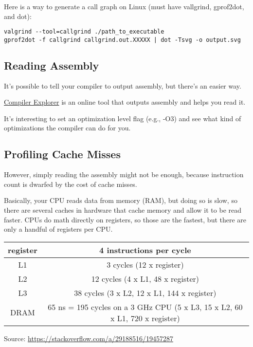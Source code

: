 \documentclass[letterpaper,11pt]{article}
\begin{document}
Here is a way to generate a call graph on Linux (must have vallgrind, gprof2dot, and dot):

\begin{verbatim}
valgrind --tool=callgrind ./path_to_executable
gprof2dot -f callgrind callgrind.out.XXXXX | dot -Tsvg -o output.svg
\end{verbatim}

\subsection{Reading Assembly}

It's possible to tell your compiler to output assembly, but there's an easier way.

\href{https://godbolt.org/}{Compiler Explorer} is an online tool that outputs assembly and helps you read it.

It's interesting to set an optimization level flag (e.g., -O3) and see what kind of optimizations the compiler can do 
for you.


\subsection{Profiling Cache Misses}

However, simply reading the assembly might not be enough, because instruction count is dwarfed by the cost of cache misses. 

Basically, your CPU reads data from memory (RAM), but doing so is slow, so there are several caches in hardware
that cache memory and allow it to be read faster. CPUs do math directly on registers, so those 
are the fastest, but there are only a handful of registers per CPU.

\begin{center}
\begin{tabular}{ |c|c| }
\hline
register & 4 instructions per cycle \\ 
\hline
L1       & 3 cycles (12 x register) \\
\hline
L2       & 12 cycles (4 x L1, 48 x register) \\
\hline
L3       & 38 cycles (3 x L2, 12 x L1, 144 x register) \\
\hline
DRAM     & 65 ns = 195 cycles on a 3 GHz CPU (5 x L3, 15 x L2, 60 x L1, 720 x register) \\
\hline
\end{tabular}
\end{center}
Source: \url{https://stackoverflow.com/a/29188516/19457287}
\end{document}
